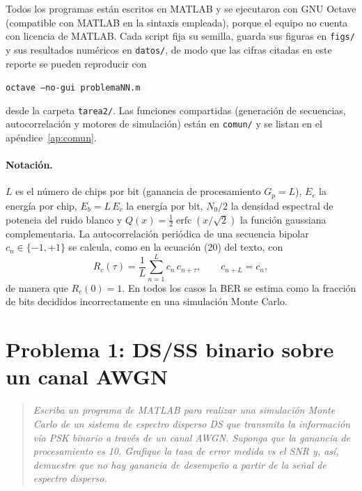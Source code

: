 \documentclass[11pt,a4paper]{article}
\begin{document}
Todos los programas están escritos en MATLAB y se ejecutaron con GNU Octave
(compatible con MATLAB en la sintaxis empleada), porque el equipo no cuenta con
licencia de MATLAB. Cada script fija su semilla, guarda sus figuras en
\texttt{figs/} y sus resultados numéricos en \texttt{datos/}, de modo que las
cifras citadas en este reporte se pueden reproducir con
\begin{center}
\texttt{octave --no-gui problemaNN.m}
\end{center}
desde la carpeta \texttt{tarea2/}. Las funciones compartidas (generación de
secuencias, autocorrelación y motores de simulación) están en \texttt{comun/} y
se listan en el apéndice~\ref{ap:comun}.

\paragraph{Notación.} $L$ es el número de chips por bit (ganancia de
procesamiento $G_p=L$), $E_c$ la energía por chip, $E_b=L\,E_c$ la energía por
bit, $N_0/2$ la densidad espectral de potencia del ruido blanco y
$Q(x)=\tfrac12\operatorname{erfc}(x/\sqrt2)$ la función gaussiana complementaria.
La autocorrelación periódica de una secuencia bipolar $c_n\in\{-1,+1\}$ se
calcula, como en la ecuación (20) del texto, con
\begin{equation}
  R_c(\tau)=\frac{1}{L}\sum_{n=1}^{L} c_n\,c_{n+\tau},
  \qquad c_{n+L}=c_n,
  \label{eq:autocorr}
\end{equation}
de manera que $R_c(0)=1$. En todos los casos la BER se estima como la fracción
de bits decididos incorrectamente en una simulación Monte Carlo.

\section{Problema 1: DS/SS binario sobre un canal AWGN}

\begin{quote}
\itshape
Escriba un programa de MATLAB para realizar una simulación Monte Carlo de un
sistema de espectro disperso DS que transmita la información vía PSK binario a
través de un canal AWGN. Suponga que la ganancia de procesamiento es 10.
Grafique la tasa de error medida vs el SNR y, así, demuestre que no hay ganancia
de desempeño a partir de la señal de espectro disperso.
\end{quote}
\end{document}
